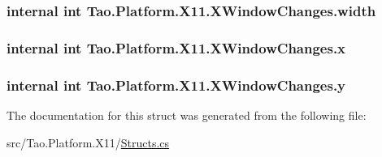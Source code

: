 \label{struct_tao_1_1_platform_1_1_x11_1_1_x_window_changes_ad3e76c50d9a4fe9465c832fa349b7b04}
\hypertarget{struct_tao_1_1_platform_1_1_x11_1_1_x_window_changes_a560f22ad1291fafb164f6326f1a1fe07}{
\subsubsection[{width}]{\setlength{\rightskip}{0pt plus 5cm}internal int {\bf Tao.Platform.X11.XWindowChanges.width}}}
\label{struct_tao_1_1_platform_1_1_x11_1_1_x_window_changes_a560f22ad1291fafb164f6326f1a1fe07}
\hypertarget{struct_tao_1_1_platform_1_1_x11_1_1_x_window_changes_a1a11c8d0ed68cfe9ce22c350048ec664}{
\subsubsection[{x}]{\setlength{\rightskip}{0pt plus 5cm}internal int {\bf Tao.Platform.X11.XWindowChanges.x}}}
\label{struct_tao_1_1_platform_1_1_x11_1_1_x_window_changes_a1a11c8d0ed68cfe9ce22c350048ec664}
\hypertarget{struct_tao_1_1_platform_1_1_x11_1_1_x_window_changes_ae1cc32ac49d759b50e5a8a0cf2de7bf0}{
\subsubsection[{y}]{\setlength{\rightskip}{0pt plus 5cm}internal int {\bf Tao.Platform.X11.XWindowChanges.y}}}
\label{struct_tao_1_1_platform_1_1_x11_1_1_x_window_changes_ae1cc32ac49d759b50e5a8a0cf2de7bf0}


The documentation for this struct was generated from the following file:\begin{DoxyCompactItemize}
\item 
src/Tao.Platform.X11/\hyperlink{_structs_8cs}{Structs.cs}\end{DoxyCompactItemize}
